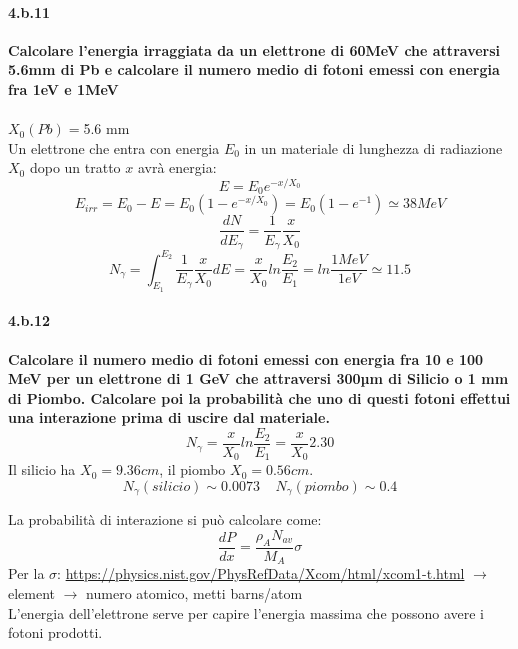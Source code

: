 \documentclass[twoside]{article}
\begin{document}
\paragraph{4.b.11}\textbf{Calcolare l'energia irraggiata da un elettrone di 60MeV che attraversi 5.6mm di Pb e calcolare il numero medio di fotoni emessi con energia fra 1eV e 1MeV}\\
\\
$X_0(Pb)=$5.6 mm\\
Un elettrone che entra con energia $E_0$ in un materiale di lunghezza di radiazione $X_0$ dopo un tratto $x$ avrà energia:
\begin{equation*}
    E=E_0 e^{-x/X_0}
\end{equation*}
\begin{equation*}
    E_{irr}=E_0-E= E_0(1-e^{-x/X_0})=E_0(1-e^{-1})\simeq 38 MeV
\end{equation*}
\begin{equation}
    \frac{dN}{dE_{\gamma}}=\frac{1}{E_\gamma}\frac{x}{X_0}
\end{equation}
\begin{equation*}
    N_{\gamma}=\int_{E_1}^{E_2} \frac{1}{E_{\gamma}}\frac{x}{X_0}dE=\frac{x}{X_0}ln\frac{E_2}{E_1}=ln\frac{1MeV}{1 eV}\simeq 11.5
\end{equation*}

\paragraph{4.b.12}\textbf{Calcolare il numero medio di fotoni emessi con energia fra 10 e 100 MeV per un elettrone di 1 GeV che attraversi 300µm di Silicio o 1 mm di Piombo. Calcolare poi la probabilità che uno di questi fotoni effettui una interazione prima di uscire dal materiale.}\\
\begin{equation*}
    N_{\gamma}=\frac{x}{X_0}ln\frac{E_2}{E_1}=\frac{x}{X_0}2.30
\end{equation*}
Il silicio ha $X_0=9.36 cm$, il piombo $X_0= 0.56cm$.
\[
N_{\gamma}(silicio)\sim 0.0073  \;\;\;\; N_{\gamma}(piombo)\sim 0.4
\]

La probabilità di interazione si può calcolare come:
\begin{equation*}
    \frac{dP}{dx}= \frac{\rho_A N_{av}}{M_A}\sigma
\end{equation*}
Per la $\sigma$: \url{https://physics.nist.gov/PhysRefData/Xcom/html/xcom1-t.html} $\rightarrow$element $\rightarrow$ numero atomico, metti barns/atom 
\\
\warning L'energia dell'elettrone serve per capire l'energia massima che possono avere i fotoni prodotti.
\\
\end{document}
